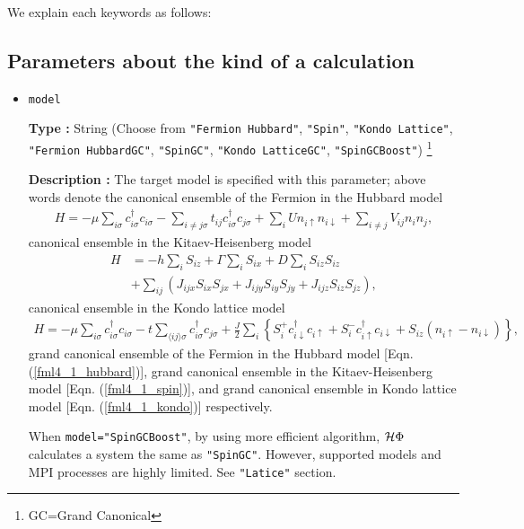 We explain each keywords as follows:

\subsection{Parameters about the kind of a calculation}

\begin{itemize}

\item \verb|model|

{\bf Type :} String (Choose from \verb|"Fermion Hubbard"|, \verb|"Spin"|, \verb|"Kondo Lattice"|, 
\verb|"Fermion HubbardGC"|, \verb|"SpinGC"|, \verb|"Kondo LatticeGC"|, \verb|"SpinGCBoost"|)
\footnote{GC=Grand Canonical}

{\bf Description :} The target model is specified with this parameter;
above words denote the canonical ensemble of the Fermion in the Hubbard model
\begin{align}
H = -\mu \sum_{i \sigma} c^\dagger_{i \sigma} c_{i \sigma} 
- \sum_{i \neq j \sigma} t_{i j} c^\dagger_{i \sigma} c_{j \sigma} 
+ \sum_{i} U n_{i \uparrow} n_{i \downarrow}
+ \sum_{i \neq j} V_{i j} n_{i} n_{j},
\label{fml4_1_hubbard}
\end{align}
canonical ensemble in the Kitaev-Heisenberg model
\begin{align}
H &= -h \sum_{i} S_{i z} + \Gamma \sum_{i} S_{i x} + D \sum_{i} S_{i z} S_{i z}
\nonumber \\
&+ \sum_{i j} \left( J_{i j x} S_{i x} S_{j x} + J_{i j y} S_{i y} S_{j y} + J_{i j z} S_{i z} S_{j z} 
\right),
\label{fml4_1_spin}
\end{align}
canonical ensemble in the Kondo lattice model
\begin{align}
H = - \mu \sum_{i \sigma} c^\dagger_{i \sigma} c_{i \sigma} 
- t \sum_{\langle i j \rangle \sigma} c^\dagger_{i \sigma} c_{j \sigma} 
+ \frac{J}{2} \sum_{i} \left\{
S_{i}^{+} c_{i \downarrow}^\dagger c_{i \uparrow}
+ S_{i}^{-} c_{i \uparrow}^\dagger c_{i \downarrow}
+ S_{i z} (n_{i \uparrow} - n_{i \downarrow})
\right\},
\label{fml4_1_kondo}
\end{align}
grand canonical ensemble of the Fermion in the Hubbard model [Eqn. (\ref{fml4_1_hubbard})],
grand canonical ensemble in the Kitaev-Heisenberg model [Eqn. (\ref{fml4_1_spin})],
and
grand canonical ensemble in Kondo lattice model [Eqn. (\ref{fml4_1_kondo})]
respectively.

When \verb|model="SpinGCBoost"|,
by using more efficient algorithm, $\mathcal{H} \Phi$ calculates a system the same as \verb|"SpinGC"|.
However, supported models and MPI processes are highly limited.
See \verb|"Latice"| section.


\end{itemize}
